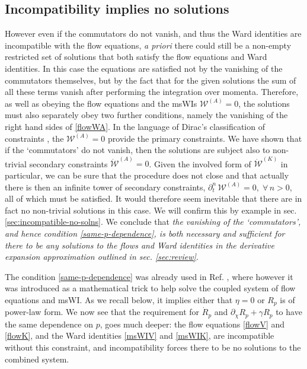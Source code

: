 \documentclass[11pt]{book}
\numberwithin{equation}{chapter}
\begin{document}
\subsection{Incompatibility implies no solutions}
\label{sec:incompatibility}

However even if the commutators do not vanish, and thus the Ward identities are incompatible
with the flow equations, {\it a priori} there could still be a non-empty restricted set of solutions
that both satisfy the flow equations and Ward identities.
In this case the equations are satisfied not by the vanishing of the commutators themselves,
but by the fact that for the given solutions the sum of all these terms vanish after
performing the integration over momenta.
Therefore, as well as obeying the flow equations and the msWIs $\mathcal{W}^{(A)}=0$,
the solutions must also separately obey two further conditions,
namely the vanishing of the right hand sides of \eqref{flowWA}.
In the language of Dirac's classification of constraints \cite{dirac2001lectures, Dirac:1950pj},
the $\mathcal{W}^{(A)}=0$ provide the primary constraints.
We have shown that if the `commutators' do not vanish,
then the solutions are subject also to non-trivial secondary constraints $\mathcal{\dot W}^{(A)}=0$.
Given the involved form of $\mathcal{\dot W}^{(K)}$ in particular,
we can be sure that the procedure does not close and that actually there is then an infinite
tower of secondary constraints, $\partial^n_t \,\mathcal{W}^{(A)}=0,\;\forall \,n>0$,
all of which must be satisfied.
It would therefore seem inevitable that there are in fact no non-trivial solutions in this case.
We will confirm this by example in sec. \ref{sec:incompatible-no-solns}.
We conclude that \emph{the vanishing of the `commutators',
and hence condition \eqref{same-p-dependence},
is both necessary and sufficient for there to be any solutions to the flows and Ward identities
in the derivative expansion approximation outlined in sec. \ref{sec:review}}.

The condition \eqref{same-p-dependence} was already used in Ref. \cite{Dietz:2015owa},
where however it was introduced as a mathematical trick to help solve the coupled system of
flow equations and msWI. As we recall below, it implies either that $\eta=0$ or $R_p$ is of power-law form.
We now see that the requirement for $\dot R_p$ and $\partial_{\chi} R_p + \gamma R_p$ to have the
same dependence on $p$, goes much deeper: the flow equations \eqref{flowV} and \eqref{flowK},
and the Ward identities \eqref{msWIV} and \eqref{msWIK}, are incompatible without this constraint,
and incompatibility forces there to be no solutions to the combined system.
\end{document}
